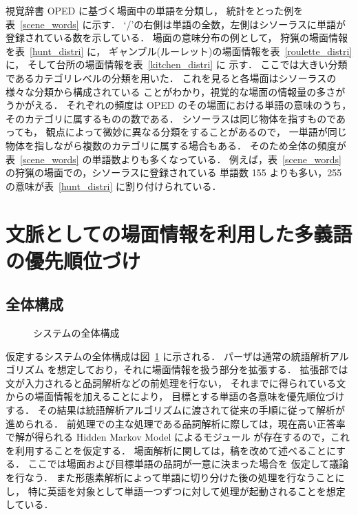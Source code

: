 視覚辞書 OPED に基づく場面中の単語を分類し，
統計をとった例を表~\ref{scene_words} に示す．
`/'の右側は単語の全数，左側はシソーラスに単語が登録されている数を示している．
場面の意味分布の例として，
狩猟の場面情報を表~\ref{hunt_distri} に，
ギャンブル(ルーレット)の場面情報を表~\ref{roulette_distri} に，
そして台所の場面情報を表~\ref{kitchen_distri} に
示す．
ここでは大きい分類であるカテゴリレベルの分類を用いた．
これを見ると各場面はシソーラスの様々な分類から構成されている
ことがわかり，視覚的な場面の情報量の多さがうかがえる．
それぞれの頻度は OPED のその場面における単語の意味のうち，
そのカテゴリに属するものの数である．
シソーラスは同じ物体を指すものであっても，
観点によって微妙に異なる分類をすることがあるので，
一単語が同じ物体を指しながら複数のカテゴリに属する場合もある．
そのため全体の頻度が表~\ref{scene_words} の単語数よりも多くなっている．
例えば，表~\ref{scene_words} の狩猟の場面での，シソーラスに登録されている
単語数 155 よりも多い，255 の意味が表~\ref{hunt_distri} に割り付けられている．


\section{文脈としての場面情報を利用した多義語の優先順位づけ}

\subsection{全体構成}

\begin{figure}
  \begin{center}
  \end{center}
  \caption{システムの全体構成}
  \label{global_st}
\end{figure}
仮定するシステムの全体構成は図~\ref{global_st} に示される．
パーザは通常の統語解析アルゴリズム\cite{Tanaka89}
を想定しており，それに場面情報を扱う部分を拡張する．
拡張部では文が入力されると品詞解析などの前処理を行ない，
それまでに得られている文からの場面情報を加えることにより，
目標とする単語の各意味を優先順位づけする．
その結果は統語解析アルゴリズムに渡されて従来の手順に従って解析が進められる．
前処理での主な処理である品詞解析に際しては，現在高い正答率で解が得られる 
Hidden Markov Model によるモジュール\cite{XEROX}
が存在するので，これを利用することを仮定する．
場面解析に関しては，稿を改めて述べることにする．
ここでは場面および目標単語の品詞が一意に決まった場合を
仮定して議論を行なう．
また形態素解析によって単語に切り分けた後の処理を行なうことにし，
特に英語を対象として単語一つずつに対して処理が起動されることを想定している．

